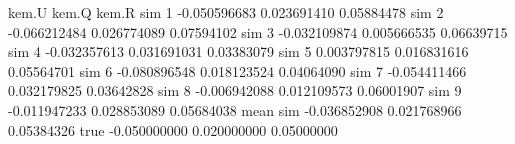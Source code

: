 \begin{Schunk}
\begin{Soutput}
                kem.U       kem.Q      kem.R
sim 1    -0.050596683 0.023691410 0.05884478
sim 2    -0.066212484 0.026774089 0.07594102
sim 3    -0.032109874 0.005666535 0.06639715
sim 4    -0.032357613 0.031691031 0.03383079
sim 5     0.003797815 0.016831616 0.05564701
sim 6    -0.080896548 0.018123524 0.04064090
sim 7    -0.054411466 0.032179825 0.03642828
sim 8    -0.006942088 0.012109573 0.06001907
sim 9    -0.011947233 0.028853089 0.05684038
mean sim -0.036852908 0.021768966 0.05384326
true     -0.050000000 0.020000000 0.05000000
\end{Soutput}
\end{Schunk}
